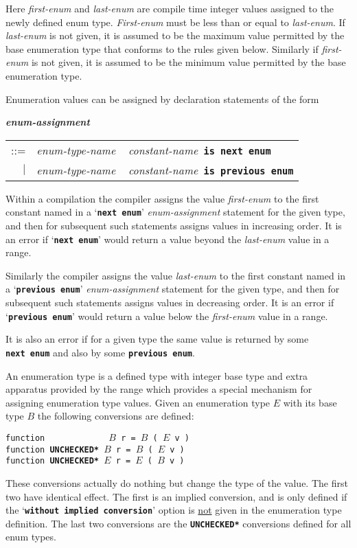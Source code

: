 \documentclass[12pt]{article}
\makeatletter
\newcommand{\TT}[1]{{\tt \bfseries #1}}
\newcommand{\emkey}[1]{{\bf \em #1}\index{#1@{\em #1}}}
\newenvironment{indpar}[1][0.3in]%
	{\begin{list}{}%
		     {\setlength{\itemsep}{0in}%
		      \setlength{\topsep}{0in}%
		      \setlength{\parsep}{1ex}%
		      \setlength{\labelwidth}{#1}%
		      \setlength{\leftmargin}{#1}%
		      \addtolength{\leftmargin}{\labelsep}}%
	 \item}%
	{\end{list}}
\makeatother
\begin{document}
Here {\em first-enum} and {\em last-enum} are compile time integer
values assigned to the newly defined enum type.
{\em First-enum} must be less than or equal to {\em last-enum}.
If {\em last-enum} is not given, it is assumed to be the maximum
value permitted by the base enumeration type that conforms to the
rules given below.
Similarly if {\em first-enum} is not given, it is assumed to be the minimum
value permitted by the base enumeration type.

Enumeration values can be assigned by declaration statements of the form
\begin{indpar}
\emkey{enum-assignment}
    \begin{tabular}[t]{rl}
    ::= & {\em enum-type-name} ~ {\em constant-name}\TT{ is next enum} \\
    $|$ & {\em enum-type-name} ~ {\em constant-name}\TT{ is previous enum}
    \end{tabular}
\end{indpar}

Within a compilation the compiler assigns the value {\em first-enum}
to the first constant named in a `\TT{next enum}'
{\em enum-assignment} statement for
the given type, and then for subsequent such statements
assigns values in increasing order.
It is an error if `\TT{next~enum}'
would return a value beyond the {\em last-enum} value in a range.

Similarly the compiler assigns the value {\em last-enum}
to the first constant named in a `\TT{previous enum}'
{\em enum-assignment} statement for
the given type, and then for subsequent such statements
assigns values in decreasing order.
It is an error if `\TT{previous~enum}'
would return a value below the {\em first-enum} value in a range.

It is also an error if for a given type the same value is returned
by some \TT{next~enum} and also by some \TT{previous~enum}.

An enumeration type is a defined type with integer base type and
extra apparatus provided by the range which provides a special
mechanism for assigning enumeration type values.
Given an enumeration type $E$ with its base type $B$
the following conversions are defined:
\begin{indpar}
{\tt function ~~~~~~~~~~~ $B$ r = $B$ ( $E$ v )} \\
{\tt function \TT{*UNCHECKED*} $B$ r = $B$ ( $E$ v )} \\
{\tt function \TT{*UNCHECKED*} $E$ r = $E$ ( $B$ v )}
\begin{indpar}
These conversions actually do nothing but change the type of the
value.  The first two have identical effect.  The first is an implied
conversion, and is only defined if the
`\TT{without implied conversion}' option is \underline{not} given in the
enumeration type definition.  The last two conversions are the
\TT{*UNCHECKED*} conversions defined for all enum types.
\end{indpar}
\end{indpar}
\end{document}
